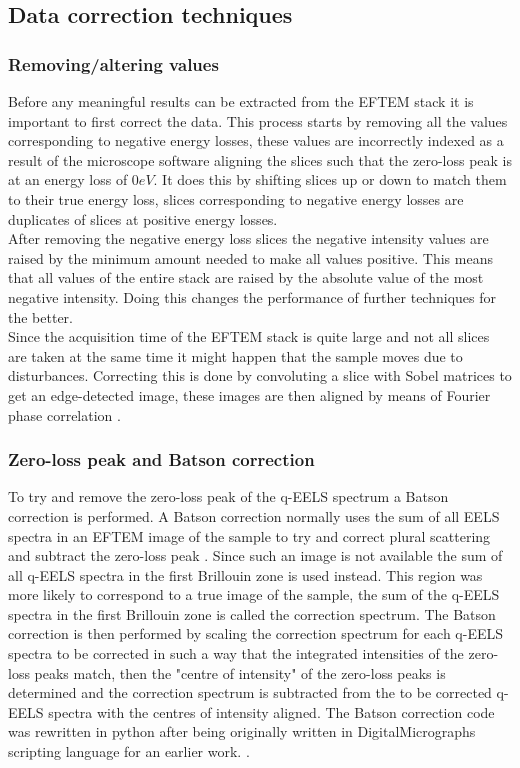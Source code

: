 \subsection{Data correction techniques}
\subsubsection{Removing/altering values}
Before any meaningful results can be extracted from the EFTEM stack it is important to first correct the data.
This process starts by removing all the values corresponding to negative energy losses, these values are incorrectly indexed as a result of the microscope software aligning the slices such that the zero-loss peak is at an energy loss of $0eV$.
It does this by shifting slices up or down to match them to their true energy loss, slices corresponding to negative energy losses are duplicates of slices at positive energy losses.\\
After removing the negative energy loss slices the negative intensity values are raised by the minimum amount needed to make all values positive.
This means that all values of the entire stack are raised by the absolute value of the most negative intensity. Doing this changes the performance of further techniques for the better.\\
Since the acquisition time of the EFTEM stack is quite large and not all slices are taken at the same time it might happen that the sample moves due to disturbances. Correcting this is done by convoluting a slice with Sobel matrices to get an edge-detected image, these images are then aligned by means of Fourier phase correlation \cite{Sjodahl:93}.

\subsubsection{Zero-loss peak and Batson correction}
\label{sec:batsen}
To try and remove the zero-loss peak of the q-EELS spectrum a Batson correction is performed. A Batson correction normally uses the sum of all EELS spectra in an EFTEM image of the sample to try and correct plural scattering and subtract the zero-loss peak \cite{PhysRevB.27.5224}. Since such an image is not available the sum of all q-EELS spectra in the first Brillouin zone is used instead. This region was more likely to correspond to a true image of the sample, the sum of the q-EELS spectra in the first Brillouin zone is called the correction spectrum.
The Batson correction is then performed by scaling the correction spectrum for each q-EELS spectra to be corrected in such a way that the integrated intensities of the zero-loss peaks match, then the "centre of intensity" of the zero-loss peaks is determined and the correction spectrum is subtracted from the to be corrected q-EELS spectra with the centres of intensity aligned.
The Batson correction code was rewritten in python after being originally written in DigitalMicrographs scripting language for an earlier work. \cite{Politano2017}.

